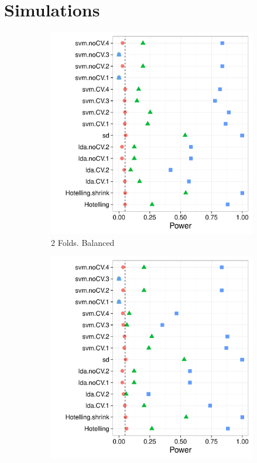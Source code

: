 \documentclass[12pt,a4paper]{article}
\begin{document}
\newpage

\section{Simulations}
\label{apx:simulations}



\begin{figure}[h]
\centering
\caption{\footnotesize [TODO].}	
\label{fig:n_folds}
	\begin{subfigure}{.5\textwidth}
	  \centering
	  \includegraphics[width=1\linewidth]{"art/2016-07-27 21:21:12"}
	  \caption{2 Folds. Balanced}  %
	\label{fig:n_folds_1}
	\end{subfigure}%
	\begin{subfigure}{.5\textwidth}
	  \centering
	  \includegraphics[width=1\linewidth]{"art/2016-07-29 07:18:24"}

\end{subfigure}
\end{figure}
\end{document}
